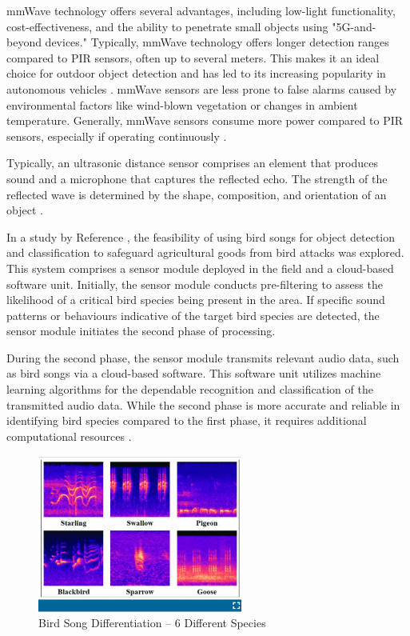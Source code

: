 \documentclass[class=report,11pt,crop=false]{standalone}
\begin{document}
\acrshort{mmWave} technology offers several advantages, including low-light functionality, cost-effectiveness, and the ability to penetrate small objects using "5G-and-beyond devices." Typically, \acrshort{mmWave} technology offers longer detection ranges compared to PIR sensors, often up to several meters. This makes it an ideal choice for outdoor object detection and has led to its increasing popularity in autonomous vehicles \cite{mmWave3}. \acrshort{mmWave} sensors are less prone to false alarms caused by environmental factors like wind-blown vegetation or changes in ambient temperature. Generally, \acrshort{mmWave} sensors consume more power compared to \acrshort{PIR} sensors, especially if operating continuously \cite{mmWavePower}.

Typically, an ultrasonic distance sensor comprises an element that produces sound and a microphone that captures the reflected echo. The strength of the reflected wave is determined by the shape, composition, and orientation of an object \cite{UltrasonicAgri}. 

In a study by Reference \cite{AcousticSensing}, the feasibility of using bird songs for object detection and classification to safeguard agricultural goods from bird attacks was explored. This system comprises a sensor module deployed in the field and a cloud-based software unit. Initially, the sensor module conducts pre-filtering to assess the likelihood of a critical bird species being present in the area. If specific sound patterns or behaviours indicative of the target bird species are detected, the sensor module initiates the second phase of processing.

During the second phase, the sensor module transmits relevant audio data, such as bird songs via a cloud-based software. This software unit utilizes machine learning algorithms for the dependable recognition and classification of the transmitted audio data. While the second phase is more accurate and reliable in identifying bird species compared to the first phase, it requires additional computational resources \cite{AcousticSensing}.

\begin{figure}[h]
    \centering
    \includegraphics[width=0.6\textwidth]{AcousticSensing [11].png}
    \caption{Bird Song Differentiation – 6 Different Species \cite{AcousticSensing}}
    \label{fig:birdsounds}
\end{figure}
\end{document}

